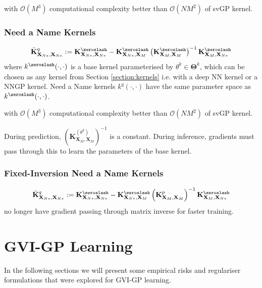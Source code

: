 \documentclass{article}
\numberwithin{equation}{section}
\begin{document}
with $\mathcal{O}(M^3)$ computational complexity better than $\mathcal{O}(NM^2)$ of svGP kernel.


\subsubsection{Need a Name Kernels}
\begin{align}
            \bar{\mathbf{K}}^q_{\mathbf{X}_{N*}, \mathbf{X}_{N*}} := \mathbf{K}^{\zeroslash}_{\mathbf{X}_{N*}, \mathbf{X}_{N*}} - \mathbf{K}^{\zeroslash}_{\mathbf{X}_{N*}, \mathbf{X}_M} \left( \mathbf{K}^{\zeroslash}_{\mathbf{X}_M, \mathbf{X}_M} \right)^{-1} \mathbf{K}^{\zeroslash}_{\mathbf{X}_M, \mathbf{X}_{N*}}
\end{align}
where $k^{\zeroslash}(\cdot, \cdot)$ is a base kernel parameterised by $\theta^k \in \boldsymbol{\Theta}^k$, which can be chosen as any kernel from Section \ref{section:kernels} i.e. with a deep NN kernel or a NNGP kernel. Need a Name kernels $k^q(\cdot, \cdot)$ have the same parameter space as $k^{\zeroslash}(\cdot, \cdot)$.

with $\mathcal{O}(M^3)$ computational complexity better than $\mathcal{O}(NM^2)$ of svGP kernel.

During prediction, $\left( \mathbf{K}^{(\theta^k)}_{\mathbf{X}_M, \mathbf{X}_M} \right)^{-1}$ is a constant. During inference, gradients must pass through this to learn the parameters of the base kernel.

\subsubsection{Fixed-Inversion Need a Name Kernels}
\begin{align}
            \bar{\mathbf{K}}^q_{\mathbf{X}_{N*}, \mathbf{X}_{N*}} := \mathbf{K}^{\zeroslash}_{\mathbf{X}_{N*}, \mathbf{X}_{N*}} - \mathbf{K}^{\zeroslash}_{\mathbf{X}_{N*}, \mathbf{X}_M} \left( \mathbf{K}^{p}_{\mathbf{X}_M, \mathbf{X}_M} \right)^{-1} \mathbf{K}^{\zeroslash}_{\mathbf{X}_M, \mathbf{X}_{N*}}
\end{align}
no longer have gradient passing through matrix inverse for faster training.

\newpage
\section{GVI-GP Learning}\label{section:gvi-gp-learning}
In the following sections we will present some empirical risks and regulariser formulations that were explored for GVI-GP learning.
\end{document}
